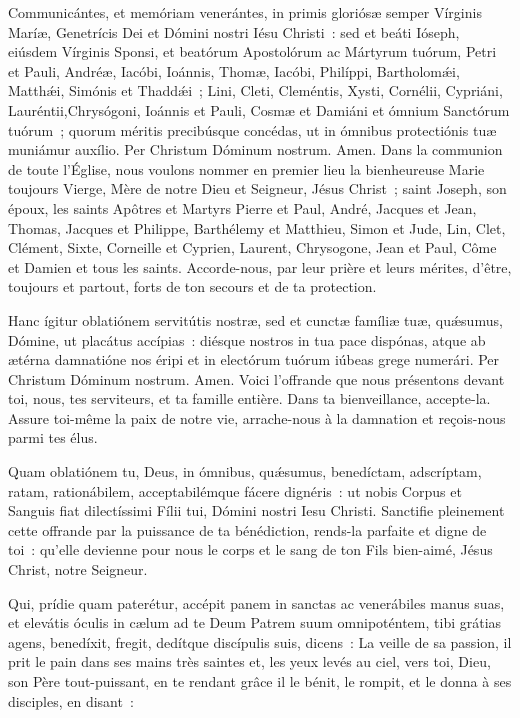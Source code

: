 \begin{paracol}{2}
\LigneParacol{0cm}
{Communicántes, et memóriam venerántes, in primis gloriósæ semper Vírginis Maríæ, Genetrícis Dei et Dómini nostri Iésu Christi~: sed et beáti Ióseph, eiúsdem Vírginis Sponsi, et beatórum Apostolórum ac Mártyrum tuórum, Petri et Pauli, Andréæ, Iacóbi, Ioánnis, Thomæ, Iacóbi, Philíppi, Bartholomǽi, Matthǽi, Simónis et Thaddǽi~; Lini, Cleti, Cleméntis, Xysti, Cornélii, Cypriáni, Lauréntii,Chrysógoni, Ioánnis et Pauli, Cosmæ et Damiáni et ómnium Sanctórum tuórum~; quorum méritis precibúsque concédas, ut in ómnibus protectiónis tuæ muniámur auxílio. Per Christum Dóminum nostrum. Amen.}
{Dans la communion de toute l'Église, nous voulons nommer en premier lieu la bienheureuse Marie toujours Vierge, Mère de notre Dieu et Seigneur, Jésus Christ~; saint Joseph, son époux, les saints Apôtres et Martyrs Pierre et Paul, André, Jacques et Jean, Thomas, Jacques et Philippe, Barthélemy et Matthieu, Simon et Jude, Lin, Clet, Clément, Sixte, Corneille et Cyprien, Laurent, Chrysogone, Jean et Paul, Côme et Damien et tous les saints. Accorde-nous, par leur prière et leurs mérites, d'être, toujours et partout, forts de ton secours et de ta protection.}

\LigneParacol{0cm}
{Hanc ígitur oblatiónem servitútis nostræ, sed et cunctæ famíliæ tuæ, quǽsumus, Dómine, ut placátus accípias~: diésque nostros in tua pace dispónas, atque ab ætérna damnatióne nos éripi et in electórum tuórum iúbeas grege numerári. Per Christum Dóminum nostrum. Amen.}
{Voici l'offrande que nous présentons devant toi, nous, tes serviteurs, et ta famille entière. Dans ta bienveillance, accepte-la. Assure toi-même la paix de notre vie, arrache-nous à la damnation et reçois-nous parmi tes élus.}

\LigneParacol{0cm}
{Quam oblatiónem tu, Deus, in ómnibus, quǽsumus, benedíctam, adscríptam, ratam, rationábilem, acceptabilémque fácere dignéris~: ut nobis Corpus et Sanguis fiat dilectíssimi Fílii tui, Dómini nostri Iesu Christi.}
{Sanctifie pleinement cette offrande par la puissance de ta bénédiction, rends-la parfaite et digne de toi~: qu'elle devienne pour nous le corps et le sang de ton Fils bien-aimé, Jésus Christ, notre Seigneur.}

\LigneParacol{0cm}
{Qui, prídie quam paterétur, accépit panem in sanctas ac venerábiles manus suas, et elevátis óculis in cælum ad te Deum Patrem suum omnipoténtem, tibi grátias agens, benedíxit, fregit, dedítque discípulis suis, dicens~:}
{La veille de sa passion, il prit le pain dans ses mains très saintes et, les yeux levés au ciel, vers toi, Dieu, son Père tout-puissant, en te rendant grâce il le bénit, le rompit, et le donna à ses disciples, en disant~:}


\end{paracol}
